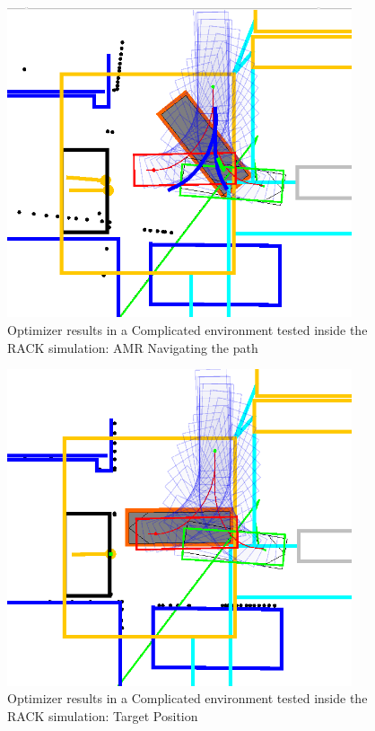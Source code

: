 \begin{figure}[H]
    \begin{center}
        \includegraphics[width=4in]{images/Chap3/2.png} %
        \caption{Optimizer results in a Complicated environment tested inside the RACK simulation: AMR Navigating the path}
        \label{OptResult7}
        \end{center}    
\end{figure}

\begin{figure}[H]
    \begin{center}
        \includegraphics[width=4in]{images/Chap3/3.png} %
        \caption{Optimizer results in a Complicated environment tested inside the RACK simulation: Target Position}
        \label{OptResult8}
        \end{center}    
\end{figure}

